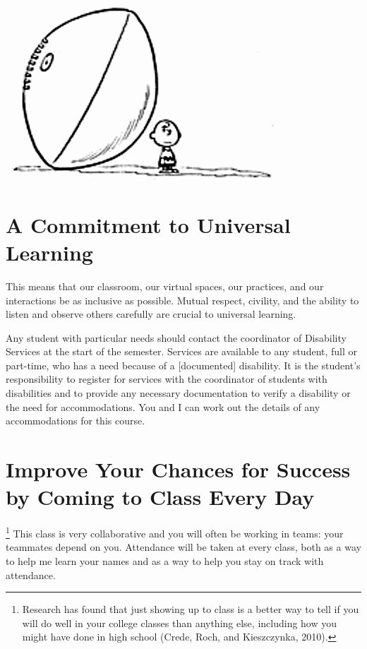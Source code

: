 \documentclass{tufte-handout}
\begin{document}
\begin{marginfigure}%
	\begin{center}
		\includegraphics[width=1\linewidth]{cp-pic3.png}
	\end{center}
\end{marginfigure}

\section{A Commitment to Universal Learning}
 This means that our classroom, our virtual spaces, our practices, and our interactions be as inclusive as possible. Mutual respect, civility, and the ability to listen and observe others carefully are crucial to universal learning.

Any student with particular needs should contact the coordinator of Disability Services at the start of the semester. Services are available to any student, full or part-time, who has a need because of a [documented] disability. It is the student's responsibility to register for services with the coordinator of students with disabilities and to provide any necessary documentation to verify a disability or the need for accommodations.  You and I can work out the details of any accommodations for this course.

\section{Improve Your Chances for Success by Coming to Class Every Day}
\footnote{Research has found that just showing up to class is a better way to tell if you will do well in your college classes than anything else, including how you might have done in high school (Crede, Roch, and Kieszczynka, 2010).} This class is very collaborative and you will often be working in teams: your teammates depend on you. Attendance will be taken at every class, both as a way to help me learn your names and as a way to help you stay on track with attendance.
\end{document}
